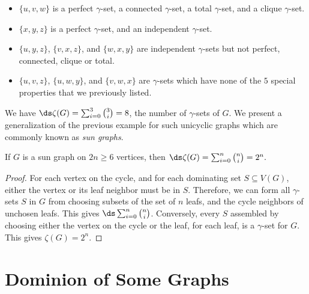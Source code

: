 \documentclass[twoside,12pt]{article}
\begin{document}
\begin{itemize}

	\item $\{u,v,w\}$ is a perfect $\gamma$-set, a connected $\gamma$-set, a total $\gamma$-set, and a clique $\gamma$-set.
	\item $\{x,y,z\}$ is a perfect $\gamma$-set, and an independent $\gamma$-set.
	 \item $\{u,y,z\}$, $\{v,x,z\}$, and $\{w,x,y\}$ are independent $\gamma$-sets but not perfect, connected, clique or total. 
	\item $\{u,v,z\}$, $\{u,w,y\}$, and $\{v,w,x\}$ are  $\gamma$-sets which have none of the $5$ special properties that we previously listed.
\end{itemize}
We have $\ds \zeta(G)=\sum_{i=0}^3{3\choose i}=8$, the number of $\gamma$-sets of $G$.
We present a generalization of the previous example for such unicyclic graphs which are commonly known as \textit{sun graphs}.


\begin{proposition}
   If $G$ is a sun graph on $2n\ge 6$ vertices, then $\ds \zeta(G)=\sum_{i=0}^n{n\choose i}=2^n. $  
\end{proposition}
    
\begin{proof}
For each vertex on the cycle, and for each dominating set $S\subseteq V(G)$, either the vertex or its leaf neighbor must be in $S$. Therefore, we can form all $\gamma$-sets $S$ in $G$ from choosing subsets of the set of $n$ leafs, and the cycle neighbors of unchosen leafs. This gives  $\ds \sum_{i=0}^n{n\choose i}$.  Conversely, every $S$ assembled by choosing either the vertex on the cycle or the leaf, for each leaf, is a $\gamma$-set for $G$. This gives $\zeta(G)=2^n$.
\end{proof}


\section{Dominion of Some Graphs}
\end{document}
